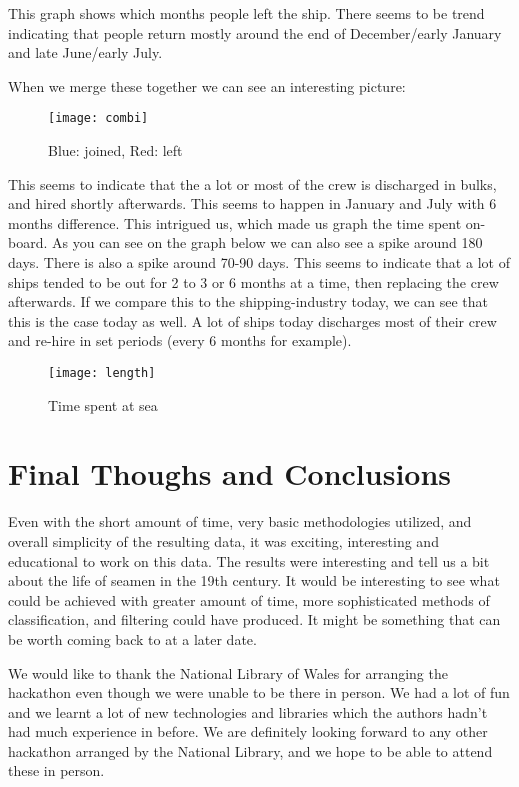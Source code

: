 \documentclass{article}
\begin{document}
This graph shows which months people left the ship. There seems to be trend indicating that people return mostly around the end of December/early January and late June/early July.

When we merge these together we can see an interesting picture:

\begin{figure}[H]
	\centering
	\texttt{[image: combi]}
  	\caption{Blue: joined, Red: left}
\end{figure}

This seems to indicate that the a lot or most of the crew is discharged in bulks, and hired shortly afterwards. This seems to happen in January and July with 6 months difference.
This intrigued us, which made us graph the time spent on-board. As you can see on the graph below we can also see a spike around 180 days. There is also a spike around 70-90 days. This seems to indicate that a lot of ships tended to be out for 2 to 3 or 6 months at a time, then replacing the crew afterwards.
If we compare this to the shipping-industry today, we can see that this is the case today as well.
A lot of ships today discharges most of their crew and re-hire in set periods (every 6 months for example).

\begin{figure}[H]
	\centering
	\texttt{[image: length]}
  	\caption{Time spent at sea}
\end{figure}

\section{Final Thoughs and Conclusions}

Even with the short amount of time, very basic methodologies utilized, and overall simplicity of the resulting data, it was exciting, interesting and educational to work on this data. 
The results were interesting and tell us a bit about the life of seamen in the 19th century.
It would be interesting to see what could be achieved with greater amount of time, more sophisticated methods of classification, and filtering could have produced.
It might be something that can be worth coming back to at a later date.

We would like to thank the National Library of Wales for arranging the hackathon even though we were unable to be there in person.
We had a lot of fun and we learnt a lot of new technologies and libraries which the authors hadn't had much experience in before.
We are definitely looking forward to any other hackathon arranged by the National Library, and we hope to be able to attend these in person.
\end{document}
